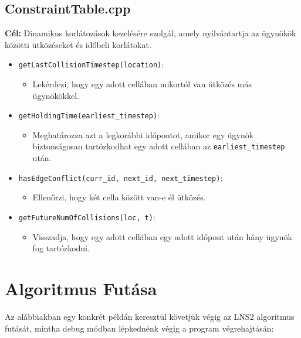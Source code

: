 \documentclass[a4paper,12pt]{article}
\begin{document}
\subsection{ConstraintTable.cpp}
\textbf{Cél:} Dinamikus korlátozások kezelésére szolgál, amely nyilvántartja az ügynökök közötti ütközéseket és időbeli korlátokat.

\begin{itemize}[label=\textbullet]
    \item \texttt{getLastCollisionTimestep(location)}:
        \begin{itemize}
            \item Lekérdezi, hogy egy adott cellában mikortól van ütközés más ügynökökkel.
        \end{itemize}

    \item \texttt{getHoldingTime(earliest\_timestep)}:
        \begin{itemize}
            \item Meghatározza azt a legkorábbi időpontot, amikor egy ügynök biztonságosan tartózkodhat egy adott cellában az \texttt{earliest\_timestep} után.
        \end{itemize}

    \item \texttt{hasEdgeConflict(curr\_id, next\_id, next\_timestep)}:
        \begin{itemize}
            \item Ellenőrzi, hogy két cella között van-e él ütközés.
        \end{itemize}

    \item \texttt{getFutureNumOfCollisions(loc, t)}:
        \begin{itemize}
            \item Visszadja, hogy egy adott cellában egy adott időpont után hány ügynök fog tartózkodni.
        \end{itemize}
\end{itemize}

\section{Algoritmus Futása}

Az alábbiakban egy konkrét példán keresztül követjük végig az LNS2 algoritmus futását, mintha debug módban lépkednénk végig a program végrehajtásán:
\end{document}
